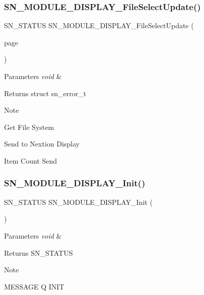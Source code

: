 \subsubsection{\texorpdfstring{S\+N\+\_\+\+M\+O\+D\+U\+L\+E\+\_\+\+D\+I\+S\+P\+L\+A\+Y\+\_\+\+File\+Select\+Update()}{SN\_MODULE\_DISPLAY\_FileSelectUpdate()}}
{\footnotesize\ttfamily S\+N\+\_\+\+S\+T\+A\+T\+US S\+N\+\_\+\+M\+O\+D\+U\+L\+E\+\_\+\+D\+I\+S\+P\+L\+A\+Y\+\_\+\+File\+Select\+Update (\begin{DoxyParamCaption}\item[{uint32\+\_\+t}]{page }\end{DoxyParamCaption})}


\begin{DoxyParams}{Parameters}
{\em void} & \\
\hline
\end{DoxyParams}
\begin{DoxyReturn}{Returns}
struct sn\+\_\+error\+\_\+t 
\end{DoxyReturn}
\begin{DoxyNote}{Note}

\end{DoxyNote}
Get File System

Send to Nextion Display

Item Count Send \mbox{\label{group__Module_ga894da8d8618a3c3b5bf2533a3a04622c}} 
\subsubsection{\texorpdfstring{S\+N\+\_\+\+M\+O\+D\+U\+L\+E\+\_\+\+D\+I\+S\+P\+L\+A\+Y\+\_\+\+Init()}{SN\_MODULE\_DISPLAY\_Init()}}
{\footnotesize\ttfamily S\+N\+\_\+\+S\+T\+A\+T\+US S\+N\+\_\+\+M\+O\+D\+U\+L\+E\+\_\+\+D\+I\+S\+P\+L\+A\+Y\+\_\+\+Init (\begin{DoxyParamCaption}\item[{void}]{ }\end{DoxyParamCaption})}


\begin{DoxyParams}{Parameters}
{\em void} & \\
\hline
\end{DoxyParams}
\begin{DoxyReturn}{Returns}
S\+N\+\_\+\+S\+T\+A\+T\+US 
\end{DoxyReturn}
\begin{DoxyNote}{Note}

\end{DoxyNote}
M\+E\+S\+S\+A\+GE Q I\+N\+IT

